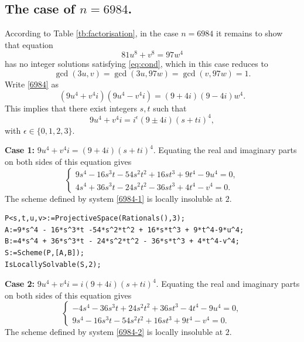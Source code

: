 \documentclass[a4paper,12pt,english,reqno]{amsart}
\begin{document}
\subsection{The case of $n=6984$.} 
 According to Table \ref{tb:factorisation}, in the case $n=6984$ it remains to
show that equation
\begin{equation}\label{6984}
81 u^8 + v^8=97  w^4
\end{equation}
has no integer solutions satisfying \eqref{eq:cond}, which in this case reduces to \[\gcd(3u,v)=\gcd(3u,97w)=\gcd(v,97w)=1.\]
Write \eqref{6984} as 
\begin{equation} (9u^4+v^4i)(9u^4-v^4i)=(9+4i)(9-4i)w^4.
\end{equation}
This implies that there exist integers $s,t$ such that 
\[9u^4+v^4i=i^{\epsilon}(9\pm 4i)(s+ti)^4,\]
with $\epsilon \in \{0,1,2,3\}$.


{\bf Case 1:} $9u^4+v^4i=(9+4i)(s+ti)^4$. Equating the real and imaginary parts on both sides of this equation gives
\begin{equation}\label{6984-1}
\begin{cases}
9s^4 - 16s^3t - 54s^2t^2 + 16st^3 + 9t^4 - 9u^4=0,\\
4s^4 + 36s^3t - 24s^2t^2 - 36st^3 + 4t^4 - v^4=0.
\end{cases}
\end{equation}
The scheme defined by system \eqref{6984-1} is locally insoluble at $2$.
%
\begin{lstlisting}
P<s,t,u,v>:=ProjectiveSpace(Rationals(),3);
A:=9*s^4 - 16*s^3*t -54*s^2*t^2 + 16*s*t^3 + 9*t^4-9*u^4;
B:=4*s^4 + 36*s^3*t - 24*s^2*t^2 - 36*s*t^3 + 4*t^4-v^4;
S:=Scheme(P,[A,B]);
IsLocallySolvable(S,2);
\end{lstlisting}


{\bf Case 2:} $9u^4+v^4i=i(9+4i)(s+ti)^4$. Equating the real and imaginary parts on both sides of this equation gives
\begin{equation}\label{6984-2}
\begin{cases}
-4s^4 - 36s^3t + 24s^2t^2 + 36st^3 - 4t^4 - 9u^4=0,\\
9s^4 - 16s^3t - 54s^2t^2 + 16st^3 + 9t^4 - v^4=0.
\end{cases}
\end{equation}
The scheme defined by system \eqref{6984-2} is locally insoluble at $2$.
\end{document}
